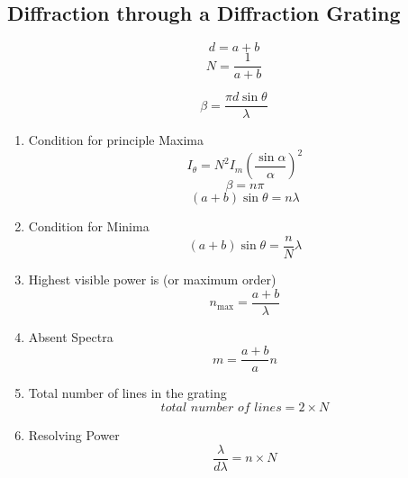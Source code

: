 \documentclass[12pt]{article}
\begin{document}
\subsection{Diffraction through a Diffraction Grating}
\begin{equation}
	d = a + b
\end{equation}
\begin{equation}
	N = \frac{1}{a+ b}
\end{equation}

\begin{equation}
	\beta = \frac{\pi d \sin\theta}{\lambda}
\end{equation}

\begin{enumerate}
	\item Condition for principle Maxima
	\begin{equation}
		I_\theta = N^2 I_m (\frac{\sin\alpha}{\alpha})^2
	\end{equation}
	\begin{equation}
		\beta = n\pi
	\end{equation}
	\begin{equation}
		(a+b)\sin\theta = n\lambda
	\end{equation}

 	 \item Condition for Minima
	  \begin{equation}
	 	(a+b) \sin\theta = \frac{n}{N}  \lambda
	 \end{equation}
  	\item Highest visible power is (or maximum order)
	\begin{equation}
		n_{\max} = \frac{a+ b}{\lambda}
	\end{equation}
	\item Absent Spectra
	\begin{equation}
		m = \frac{a+b}{a} n
	\end{equation}

	\item Total number of lines in the grating
	\begin{equation}
		\textit{total number of lines} = 2 \times N
	\end{equation}

	\item Resolving Power
	\begin{equation}
		\frac{\lambda}{d\lambda} = n \times N
	\end{equation}
\end{enumerate}
\clearpage
\end{document}
